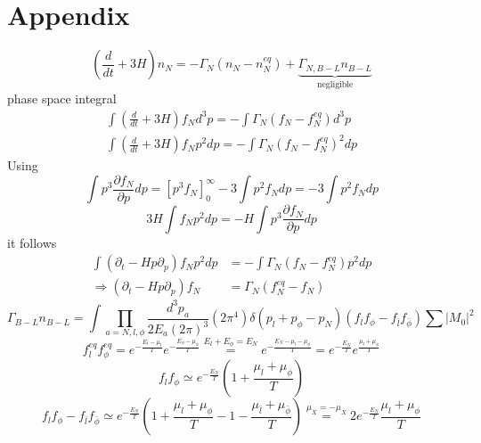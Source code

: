 \appendix
\section{Appendix}
\begin{equation*}
(\frac{d}{dt}+3H)n_N=-\Gamma_N(n_N-n_N^{eq})+\underbrace{\Gamma_{N,B-L}n_{B-L}}_\text{negligible}
\end{equation*}
phase space integral
\begin{align*}
\int (\frac{d}{dt}+3H)f_Nd^3p=-\int\Gamma_N(f_N-f_N^{eq})d^3p\\
\int (\frac{d}{dt}+3H)f_Np^2dp=-\int\Gamma_N(f_N-f_N^{eq})^2dp
\end{align*}
Using
\begin{equation*}
\int p^3\frac{\partial f_N}{\partial p}dp=\left[p^3f_N\right]_0^\infty-3\int p^2f_Ndp=-3\int p^2f_Ndp
\end{equation*}
\begin{equation*}
3H\int f_Np^2dp=-H\int p^3\frac{\partial f_N}{\partial p}dp
\end{equation*}
it follows
\begin{align*}
\int (\partial_t-Hp\partial_p)f_Np^2dp&=-\int\Gamma_N(f_N-f_N^{eq})p^2dp\\
\Rightarrow (\partial_t-Hp\partial_p)f_N&=\Gamma_N(f_N^{eq}-f_N)
\end{align*}
\newpage
\begin{equation*}
	\Gamma_{B-L}n_{B-L}=\int\prod_{a=N,l,\phi}\frac{d^3p_a}{2E_a(2\pi)^3}(2\pi^4)\delta(p_l+p_\phi-p_N)(	f_lf_\phi-f_{\bar{l}}f_{\bar{\phi}})\sum|M_0|^2
\end{equation*}
\newline
\begin{equation*}
f_l^{eq}f_\phi^{eq}=e^{-\frac{E_l-\mu_l}{T}}e^{-\frac{E_\phi-\mu_\phi}{T}}\overset{E_l+E_\phi=E_N}{=}e^{-\frac{E_N-\mu_l-\mu_\phi}{T}}=e^{-\frac{E_N}{T}}e^{\frac{\mu_l+\mu_\phi}{T}}
\end{equation*}
\begin{equation*}
	f_lf_\phi\simeq e^{-\frac{E_N}{T}}\left(1+\frac{\mu_l+\mu_\phi}{T}\right)
\end{equation*}
\begin{equation*}
	f_lf_\phi-f_{\bar{l}}f_{\bar{\phi}}\simeq e^{-\frac{E_N}{T}}\left(1+\frac{\mu_l+\mu_\phi}{T}-1-\frac{\mu_{\bar{l}}+\mu_{\bar{\phi}}}{T}\right)\overset{\mu_X=-\mu_{\bar{X}}}{=}2e^{-\frac{E_N}{T}}\frac{\mu_l+\mu_\phi}{T}
\end{equation*}
\newpage
